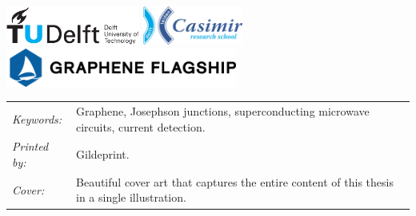 \begin{titlepage}
\begin{tabular}{p{3.5cm}l}


    
\end{tabular}


\vfill
\begin{center}
    \centering
    \includegraphics[height=0.5in]{title/logos/tudelft}
    \hspace{2em}
    \includegraphics[height=0.5in]{title/logos/casimir}
    \vspace{0.5cm}\newline
    \includegraphics[height=0.5in]{title/logos/flagship}
\end{center}
\vfill

\noindent
\begin{tabular}{@{}p{}@{}p{}}
    \textit{Keywords:} & Graphene, Josephson junctions, superconducting microwave circuits, current detection. \\
    \textit{Printed by:} &  Gildeprint. \\
    \textit{Cover:} & Beautiful cover art that captures the entire content of this thesis in a single illustration.
\end{tabular}


\end{titlepage}
